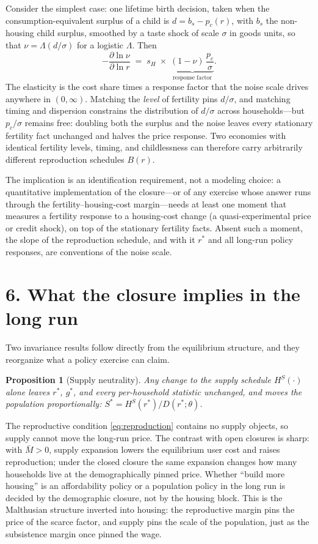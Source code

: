 \documentclass[11pt]{article}
\newtheorem{proposition}{Proposition}
\theoremstyle{definition}
\begin{document}
Consider the simplest case: one lifetime birth decision, taken when the
consumption-equivalent surplus of a child is $d=b_s-p_c(r)$, with $b_s$ the
non-housing child surplus, smoothed by a taste shock of scale $\sigma$ in
goods units, so that $\nu=\Lambda(d/\sigma)$ for a logistic $\Lambda$. Then
\begin{equation}
-\frac{\partial\ln\nu}{\partial\ln r}
\;=\;
s_H\;\times\;\underbrace{(1-\nu)\,\frac{p_c}{\sigma}}_{\text{response factor}} .
\label{eq:attenuation}
\end{equation}
The elasticity is the cost share times a response factor that the noise scale
drives anywhere in $(0,\infty)$. Matching the \emph{level} of fertility pins
$d/\sigma$, and matching timing and dispersion constrains the distribution of
$d/\sigma$ across households---but $p_c/\sigma$ remains free: doubling both
the surplus and the noise leaves every stationary fertility fact unchanged and
halves the price response. Two economies with identical fertility levels,
timing, and childlessness can therefore carry arbitrarily different
reproduction schedules $B(r)$.

The implication is an identification requirement, not a modeling choice: a
quantitative implementation of the closure---or of any exercise whose answer
runs through the fertility--housing-cost margin---needs at least one moment
that measures a fertility response to a housing-cost change (a
quasi-experimental price or credit shock), on top of the stationary fertility
facts. Absent such a moment, the slope of the reproduction schedule, and with
it $r^{*}$ and all long-run policy responses, are conventions of the noise
scale.

\section*{6. What the closure implies in the long run}

Two invariance results follow directly from the equilibrium structure, and
they reorganize what a policy exercise can claim.

\begin{proposition}[Supply neutrality]\label{prop:supply}
Any change to the supply schedule $H^S(\cdot)$ alone leaves $r^{*}$,
$g^{*}$, and every per-household statistic unchanged, and moves the
population proportionally: $S^{*}=H^S(r^{*})/D(r^{*};\theta)$.
\end{proposition}

The reproductive condition \eqref{eq:reproduction} contains no supply objects,
so supply cannot move the long-run price. The contrast with open closures is
sharp: with $\bar M>0$, supply expansion lowers the equilibrium user cost and
raises reproduction; under the closed closure the same expansion changes how
many households live at the demographically pinned price. Whether ``build more
housing'' is an affordability policy or a population policy in the long run is
decided by the demographic closure, not by the housing block. This is the
Malthusian structure inverted into housing: the reproductive margin pins the
price of the scarce factor, and supply pins the scale of the population, just
as the subsistence margin once pinned the wage.
\end{document}
